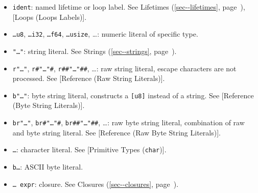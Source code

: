 \documentclass[a4paper,]{book}
\renewcommand*{\hyperref}[2][\ar]{%
  \def\ar{#2}%
  #2 (\autoref{#1}, page~\pageref{#1})}
\begin{document}
\begin{itemize}
\itemsep1pt\parskip0pt
\item
  \texttt{\textquotesingle{}ident}: named lifetime or loop label. See
  \hyperref[sec--lifetimes]{Lifetimes}, {[}Loops (Loops Labels){]}.
\item
  \texttt{\ldots{}u8}, \texttt{\ldots{}i32}, \texttt{\ldots{}f64},
  \texttt{\ldots{}usize}, \ldots{}: numeric literal of specific type.
\item
  \texttt{"\ldots{}"}: string literal. See
  \hyperref[sec--strings]{Strings}.
\item
  \texttt{r"\ldots{}"}, \texttt{r\#"\ldots{}"\#},
  \texttt{r\#\#"\ldots{}"\#\#}, \ldots{}: raw string literal, escape
  characters are not processed. See {[}Reference (Raw String
  Literals){]}.
\item
  \texttt{b"\ldots{}"}: byte string literal, constructs a
  \texttt{{[}u8{]}} instead of a string. See {[}Reference (Byte String
  Literals){]}.
\item
  \texttt{br"\ldots{}"}, \texttt{br\#"\ldots{}"\#},
  \texttt{br\#\#"\ldots{}"\#\#}, \ldots{}: raw byte string literal,
  combination of raw and byte string literal. See {[}Reference (Raw Byte
  String Literals){]}.
\item
  \texttt{\textquotesingle{}\ldots{}\textquotesingle{}}: character
  literal. See {[}Primitive Types (\texttt{char}){]}.
\item
  \texttt{b\textquotesingle{}\ldots{}\textquotesingle{}}: ASCII byte
  literal.
\item
  \texttt{\textbar{}\ldots{}\textbar{}\ expr}: closure. See
  \hyperref[sec--closures]{Closures}.
\end{itemize}
\end{document}
